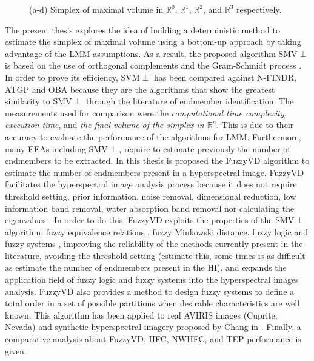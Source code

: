 \documentclass[11pt, oneside]{Thesis} %
\begin{document}
\begin{figure}[ht]
  \centering
  \centering
  \caption{ (a-d) Simplex of maximal volume in $\mathbb{R}^0$, $\mathbb{R}^1$, $\mathbb{R}^2$, and $\mathbb{R}^3$ 
  respectively.}
  \label{FigureSinplexes}
\end{figure}

The present thesis explores the idea of building a deterministic method to estimate the simplex of 
maximal volume using a bottom-up approach by taking advantage of the LMM assumptions. As a result, 
the proposed algorithm SMV$\perp$ is based on the use of orthogonal complements \cite{PeterLax} 
and the Gram-Schmidt process \cite{Klaus}. In order to prove its efficiency, SVM$\perp$ has 
been compared against N-FINDR, ATGP and OBA because they are 
the algorithms that show the greatest similarity to SMV$\perp$ through the literature of endmember 
identification. The measurements used for comparison were the \emph{computational time complexity}, 
\emph{execution time}, and \emph{the final volume of the simplex in $\mathbb{R}^n$}. 
This is due to their accuracy to evaluate the performance of the algorithms for LMM. 
Furthermore, many EEAs including SMV$\perp$, require to estimate previously the number 
of endmembers to be extracted. In this thesis is proposed the FuzzyVD algorithm to estimate 
the number of endmembers present in a hyperspectral image. FuzzyVD facilitates the hyperspectral 
image analysis process because it does not require threshold setting, 
prior information, noise removal, dimensional reduction, low information band 
removal, water absorption band removal nor calculating the eigenvalues \cite{VD}. 
In order to do this, FuzzyVD 
exploits the properties of the SMV$\perp$ algorithm, 
fuzzy equivalence relations \cite{Klir}, fuzzy Minkowski distance\cite{Klir}, 
fuzzy logic \cite{Klir} and fuzzy systems \cite{Klir}, improving the reliability of 
the methods currently present in the literature, avoiding the threshold setting 
(estimate this, some times is as difficult as estimate the number of endmembers present in the HI), 
and expands the application field of fuzzy logic and fuzzy systems into the hyperspectral 
images analysis. 
FuzzyVD also provides a method to design fuzzy systems to define a total order in a set of 
possible partitions when desirable characteristics are well known. This algorithm has been 
applied to real AVIRIS \cite{AVIRIS} images (Cuprite, Nevada) and synthetic hyperspectral 
imagery proposed by 
Chang in \cite{ChangBig2013}. Finally, a comparative analysis about FuzzyVD, 
HFC, NWHFC, and TEP performance is given.
\end{document}
